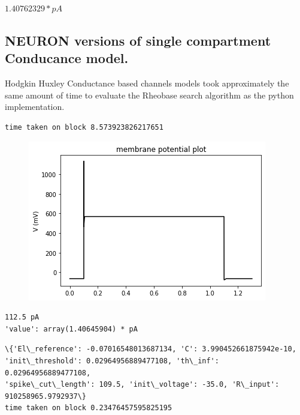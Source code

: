 $ 1.40762329 * pA $


\subsection{NEURON versions of single compartment Conducance
model.}

Hodgkin Huxley Conductance based channels models took approximately the same amount of time to evaluate the Rheobase search algorithm as the python implementation.



    \begin{verbatim}
time taken on block 8.573923826217651
    \end{verbatim}


    \begin{center}
    \begin{figure}
    \includegraphics{figures/backend_check_files/backend_check_26_2}
    \end{figure}
    
    \end{center}
\begin{verbatim}
112.5 pA
'value': array(1.40645904) * pA
\end{verbatim}


\begin{verbatim}
\{'El\_reference': -0.07016548013687134, 'C': 3.990452661875942e-10,
'init\_threshold': 0.02964956889477108, 'th\_inf': 0.02964956889477108,
'spike\_cut\_length': 109.5, 'init\_voltage': -35.0, 'R\_input': 910258965.9792937\}
time taken on block 0.23476457595825195
\end{verbatim}

